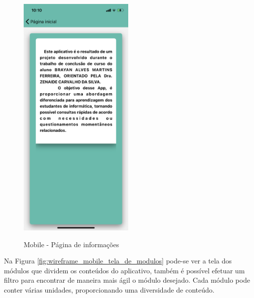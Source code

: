 \begin{figure}[H]
    \centering
    \caption{Mobile - Página de informações}
    \includegraphics[width=0.5\textwidth]{figuras/Mobile - pagina de informacoes.png}
    \label{fig:wireframe_mobile_tela_de_informacoes}
    {}
\end{figure}

Na Figura \ref{fig:wireframe_mobile_tela_de_modulos} pode-se ver a tela dos módulos que dividem os conteúdos do aplicativo, também é possível efetuar um filtro para encontrar de maneira mais ágil o módulo desejado. Cada módulo pode conter várias unidades, proporcionando uma diversidade de conteúdo.

